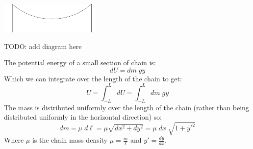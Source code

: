 \documentclass[12pt]{article}
\newcommand{\purple}[1]{{\color{purple} #1}}
\begin{document}
\newpage

\purple{

\includegraphics[width=5cm]{hanging-chain.png}

TODO: add diagram here

The potential energy of a small section of chain is:
$$
dU = dm \; g y
$$
Which we can integrate over the length of the chain to get:
$$
U = \displaystyle \int_{-L}^L dU = \displaystyle \int_{-L}^L dm \; g y
$$
The mass is distributed uniformly over the length of the chain (rather than being distributed uniformly in the horizontal direction) so:
$$
dm = \mu \; d\ell = \mu \sqrt{dx^2 + dy^2} = \mu \; dx \; \sqrt{1 + y'^2} 
$$
Where $\mu$ is the chain mass density $\mu = \tfrac{m}{\ell}$ and $y' = \tfrac{dy}{dx}$.

}
\end{document}
